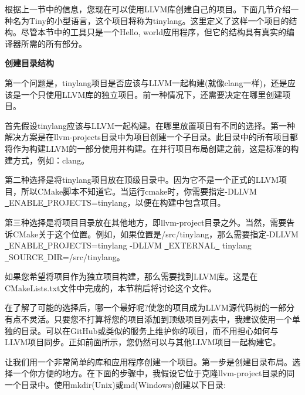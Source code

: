 根据上一节中的信息，您现在可以使用LLVM库创建自己的项目。下面几节介绍一种名为Tiny的小型语言，这个项目将称为tinylang。这里定义了这样一个项目的结构。尽管本节中的工具只是一个Hello, world应用程序，但它的结构具有真实的编译器所需的所有部分。\par

\hspace*{\fill} \par %
\textbf{创建目录结构}

第一个问题是，tinylang项目是否应该与LLVM一起构建(就像clang一样)，还是应该是一个只使用LLVM库的独立项目。前一种情况下，还需要决定在哪里创建项目。\par

首先假设tinylang应该与LLVM一起构建。在哪里放置项目有不同的选择。第一种解决方案是在llvm-projects目录中为项目创建一个子目录。此目录中的所有项目都将作为构建LLVM的一部分使用并构建。在并行项目布局创建之前，这是标准的构建方式，例如：clang。\par

第二种选择是将tinylang项目放在顶级目录中。因为它不是一个正式的LLVM项目，所以CMake脚本不知道它。当运行cmake时，你需要指定-DLLVM \underline{~}ENABLE\underline{~}PROJECTS=tinylang，以便在构建中包含项目。\par

第三种选择是将项目目录放在其他地方，即llvm-project目录之外。当然，需要告诉CMake关于这个位置。例如，如果位置是/src/tinylang，那么需要指定-DLLVM \underline{~}ENABLE\underline{~}PROJECTS=tinylang -DLLVM \underline{~}EXTERNAL\underline{~} tinylang \underline{~}SOURCE\underline{~}DIR=/src/tinylang。\par

如果您希望将项目作为独立项目构建，那么需要找到LLVM库。这是在CMakeLists.txt文件中完成的，本节稍后将讨论这个文件。\par

在了解了可能的选择后，哪一个最好呢?使您的项目成为LLVM源代码树的一部分有点不灵活。只要您不打算将您的项目添加到顶级项目列表中，我建议使用一个单独的目录。可以在GitHub或类似的服务上维护你的项目，而不用担心如何与LLVM项目同步。正如前面所示，您仍然可以与其他LLVM项目一起构建它。\par

让我们用一个非常简单的库和应用程序创建一个项目。第一步是创建目录布局。选择一个你方便的地方。在下面的步骤中，我假设它位于克隆llvm-project目录的同一个目录中。使用mkdir(Unix)或md(Windows)创建以下目录:\par

